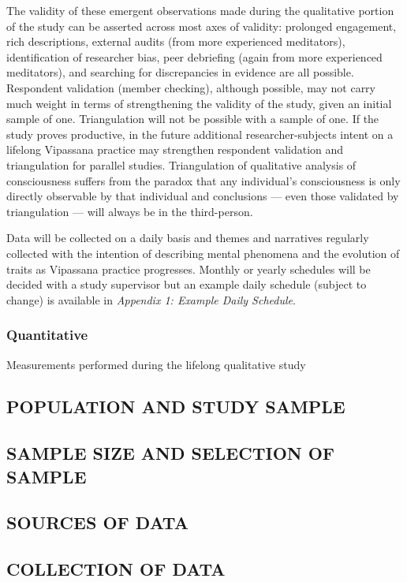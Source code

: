 \documentclass[a4paper, amsfonts, amssymb, amsmath, reprint, showkeys, nofootinbib, twoside]{revtex4-1}
\begin{document}
The validity of these emergent observations made during the qualitative portion of
the study can be asserted across most axes of validity: prolonged engagement, rich
descriptions, external audits (from more experienced meditators), identification of
researcher bias, peer debriefing (again from more experienced meditators), and
searching for discrepancies in evidence are all possible. Respondent validation (member
checking), although possible, may not carry much weight in terms of strengthening the
validity of the study, given an initial sample of one. Triangulation will not be
possible with a sample of one. If the study proves productive, in the future
additional researcher-subjects intent on a lifelong Vipassana practice may strengthen
respondent validation and triangulation for parallel studies. Triangulation of
qualitative analysis of consciousness suffers from the paradox that any individual's
consciousness is only directly observable by that individual and conclusions --- even
those validated by triangulation --- will always be in the third-person.

Data will be collected on a daily basis and themes and narratives regularly collected
with the intention of
describing mental phenomena and the evolution of traits as Vipassana practice
progresses. Monthly or yearly schedules will be decided with a
study supervisor but an example daily schedule
(subject to change) is available in \textit{Appendix 1: Example Daily Schedule}.

\subsubsection{Quantitative}

Measurements performed during the lifelong qualitative study

\subsection{POPULATION AND STUDY SAMPLE}
\subsection{SAMPLE SIZE AND SELECTION OF SAMPLE}
\subsection{SOURCES OF DATA}
\subsection{COLLECTION OF DATA}
\end{document}
